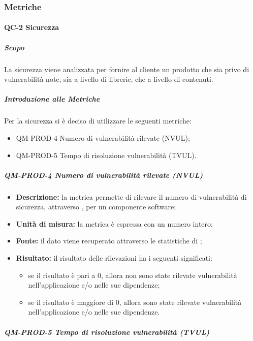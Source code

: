 		\subsubsection{Metriche}





		\paragraph{QC-2 Sicurezza}
		\subparagraph{Scopo}
			La sicurezza viene analizzata per fornire al cliente un prodotto che sia privo di vulnerabilità note, sia a livello di librerie, che a livello di contenuti.
		\subparagraph{Introduzione alle Metriche}
			Per la sicurezza si è deciso di utilizzare le seguenti metriche:
			\begin{itemize}
				\item QM-PROD-4 Numero di vulnerabilità rilevate (NVUL);
				\item QM-PROD-5 Tempo di risoluzione vulnerabilità (TVUL).
			\end{itemize}
			\subparagraph{ QM-PROD-4 Numero di vulnerabilità rilevate (NVUL)}
			\begin{itemize}
      			\item \textbf{Descrizione: }
					la metrica permette di rilevare il numero di vulnerabilità di sicurezza, attraverso , per un componente software;
				\item \textbf{Unità di misura: }
					la metrica è espressa con un numero intero;
				\item \textbf{Fonte: }
					il dato viene recuperato attraverso le statistiche di ;
				\item \textbf{Risultato: }
					il risultato delle rilevazioni ha i seguenti significati:
					\begin{itemize}
						\item se il risultato è pari a 0, allora non sono state rilevate vulnerabilità nell'applicazione e/o nelle sue dipendenze;
						\item se il risultato è maggiore di 0, allora sono state rilevate vulnerabilità nell'applicazione e/o nelle sue dipendenze.
					\end{itemize}
			\end{itemize}
			\subparagraph{ QM-PROD-5 Tempo di risoluzione vulnerabilità (TVUL) }
